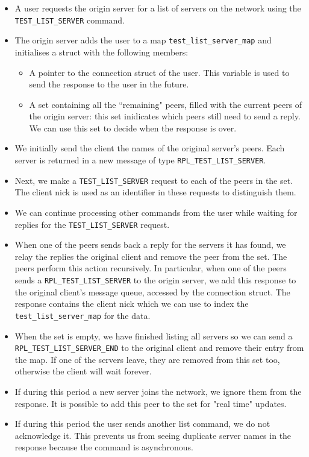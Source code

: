 \documentclass[letterpaper,twocolumn,10pt]{article}
\begin{document}
\begin{itemize}

	\item A user requests the origin server for a list of servers on the network using the \verb|TEST_LIST_SERVER| command.
	\item The origin server adds the user to a map \verb|test_list_server_map| and initialises a struct
	      with the
	      following members:
	      \begin{itemize}
		      \item A pointer to the connection struct of the user.
		            This variable is used to send the response to the user in the future.
		      \item A set containing all the ``remaining" peers, filled with the current peers of the origin server:
		            this set inidicates which peers still need to send a reply. We can use this set to decide when the response is over.
	      \end{itemize}

	\item We initially send the client the names of the original server's peers. Each
	      server is returned in a new message of type \verb|RPL_TEST_LIST_SERVER|.
	\item Next, we make a \verb|TEST_LIST_SERVER| request to each of the peers in the set.
	      The client nick is used as an identifier in these requests to distinguish them.
	\item We can continue processing other commands from the user while waiting for
	      replies for
	      the \verb|TEST_LIST_SERVER| request.
	\item When one of the peers sends back a reply for the servers it has found, we relay the replies
	      the original client and remove the peer from the set. The peers perform this action recursively. In particular, when one of the peers sends a
	      \verb|RPL_TEST_LIST_SERVER| to the origin server, we add this response to the
	      original client's message queue, accessed by the connection struct.
	      The response contains the client nick which we can use
	      to index the \verb|test_list_server_map| for the data.
	\item When the set is empty, we have finished listing all
	      servers so we can send a \verb|RPL_TEST_LIST_SERVER_END| to the
	      original client and remove their entry from the map. If one of the servers leave,
	      they are removed from this set too, otherwise the client will wait forever.
	\item If during this period a new server joins the network, we
	      ignore them from the response. It is possible to add this peer to the set for
	      "real time" updates.
	\item If during this period the user sends another list command, we do not acknowledge it. This prevents us
	      from seeing duplicate server names in the response because the command is asynchronous.
\end{itemize}
\end{document}
